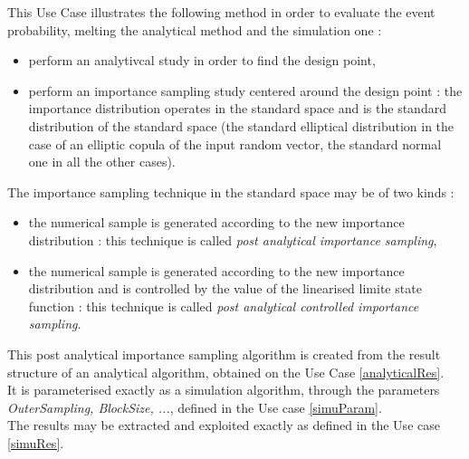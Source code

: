 \renewcommand{\filename}{docUC_ThresholdExceedance_FORMandImportanceSampling.tex}
\renewcommand{\filetitle}{UC : Probability evaluation from an analytical method (FORM/SORM) followed by a simulation method centered on the design point}

\HeaderIIILevel





This Use Case illustrates the following method in order to evaluate the event probability, melting the analytical method and the simulation one :
\begin{itemize}
\item  perform an analytivcal study in order to find the design point,
\item  perform an importance sampling study centered around the design point : the importance distribution operates in the standard space and is the standard distribution of the standard space (the standard elliptical distribution in the case of an elliptic copula of the input random vector, the standard normal one in all the other cases).
\end{itemize}

The importance sampling technique in the standard space may be of two kinds :
\begin{itemize}
\item the numerical sample is generated according to the new importance distribution : this technique is called {\itshape post analytical  importance sampling},
\item the numerical sample is generated according to the new importance distribution and is controlled by the value of the linearised limite state function : this technique is called {\itshape post analytical  controlled importance sampling}.
\end{itemize}

This post analytical importance sampling algorithm is created from the result structure of an analytical algorithm, obtained on the Use Case \ref{analyticalRes}.\\
It is parameterised exactly as a simulation algorithm, through the parameters {\itshape OuterSampling, BlockSize, ...}, defined in the Use case \ref{simuParam}. \\
The results may be extracted and exploited exactly as defined in the Use case \ref{simuRes}.\\

